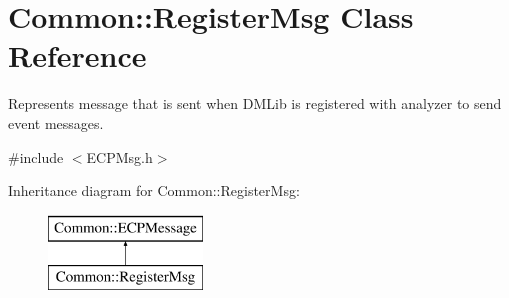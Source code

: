 \hypertarget{class_common_1_1_register_msg}{\section{Common\-:\-:Register\-Msg Class Reference}
\label{class_common_1_1_register_msg}
}


Represents message that is sent when D\-M\-Lib is registered with analyzer to send event messages.  




{\ttfamily \#include $<$E\-C\-P\-Msg.\-h$>$}

Inheritance diagram for Common\-:\-:Register\-Msg\-:\begin{figure}[H]
\begin{center}
\leavevmode
\includegraphics[height=2.000000cm]{class_common_1_1_register_msg}
\end{center}
\end{figure}
